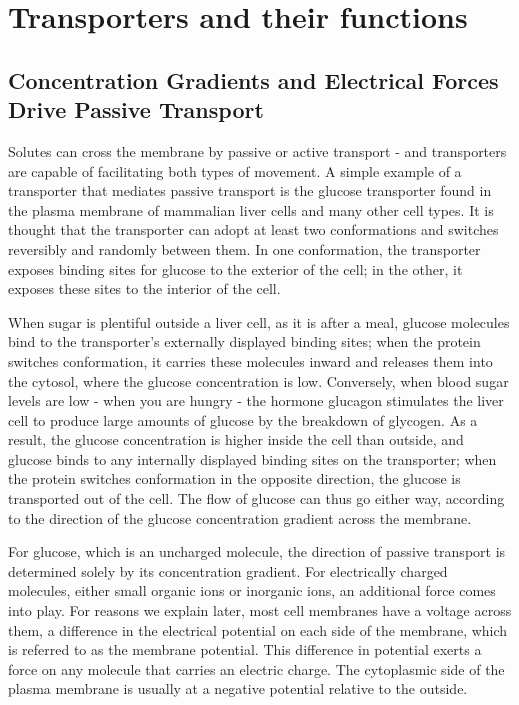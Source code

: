 \section{Transporters and their functions}

\subsection{Concentration Gradients and Electrical Forces Drive Passive Transport}

Solutes can cross the membrane by passive or active transport - and
transporters are capable of facilitating both types of movement.
A simple example of a transporter that mediates passive transport
is the glucose transporter found in the plasma membrane of mammalian
liver cells and many other cell types. It is thought that the
transporter can adopt at least two conformations and switches reversibly
and randomly between them. In one conformation, the transporter
exposes binding sites for glucose to the exterior of the cell; in the other, it
exposes these sites to the interior of the cell.

When sugar is plentiful outside a liver cell, as it is after a meal, glucose
molecules bind to the transporter’s externally displayed binding sites;
when the protein switches conformation, it carries these molecules
inward and releases them into the cytosol, where the glucose concentration
is low. Conversely, when blood sugar levels are low - when you
are hungry - the hormone glucagon stimulates the liver cell to produce
large amounts of glucose by the breakdown of glycogen. As a result, the
glucose concentration is higher inside the cell than outside, and glucose
binds to any internally displayed binding sites on the transporter; when
the protein switches conformation in the opposite direction, the glucose
is transported out of the cell. The flow of glucose can thus go either way,
according to the direction of the glucose concentration gradient across
the membrane.

For glucose, which is an uncharged molecule, the direction of passive
transport is determined solely by its concentration gradient. For electrically
charged molecules, either small organic ions or inorganic ions, an
additional force comes into play. For reasons we explain later, most cell
membranes have a voltage across them, a difference in the electrical
potential on each side of the membrane, which is referred to as the membrane
potential. This difference in potential exerts a force on any molecule
that carries an electric charge. The cytoplasmic side of the plasma membrane
is usually at a negative potential relative to the outside.

